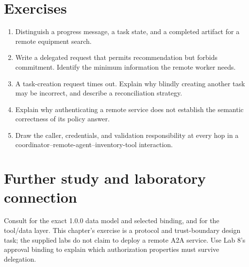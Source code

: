 \section{Exercises}
\begin{enumerate}
\item Distinguish a progress message, a task state, and a completed artifact for a remote equipment search.
\item Write a delegated request that permits recommendation but forbids commitment. Identify the minimum information the remote worker needs.
\item A task-creation request times out. Explain why blindly creating another task may be incorrect, and describe a reconciliation strategy.
\item Explain why authenticating a remote service does not establish the semantic correctness of its policy answer.
\item Draw the caller, credentials, and validation responsibility at every hop in a coordinator–remote-agent–inventory-tool interaction.
\end{enumerate}

\section{Further study and laboratory connection}
Consult \cite{a2a} for the exact 1.0.0 data model and selected binding, and \cite{mcp-spec} for the tool/data layer. This chapter's exercise is a protocol and trust-boundary design task; the supplied labs do not claim to deploy a remote A2A service. Use Lab 8's approval binding to explain which authorization properties must survive delegation.

